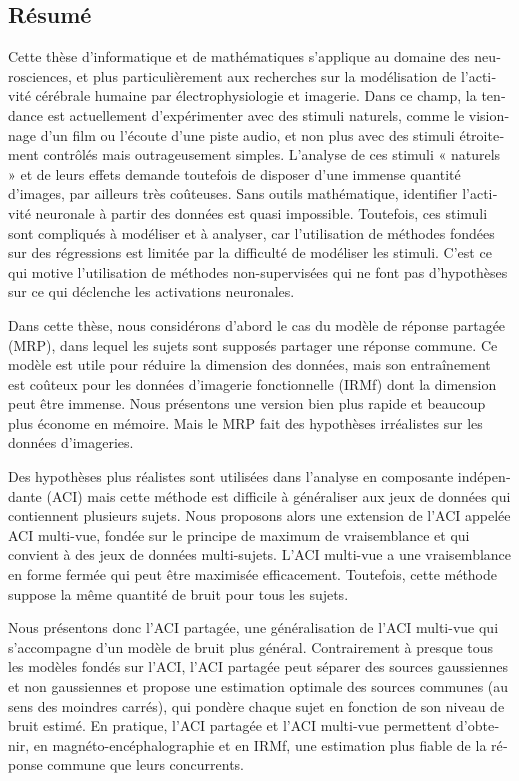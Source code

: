 \begin{otherlanguage}{french}
\chapter*{Résumé}
Cette thèse d'informatique et de mathématiques s'applique au domaine des neurosciences, et plus particulièrement aux recherches sur la modélisation de l'activité cérébrale humaine par électrophysiologie et imagerie.
%
Dans ce champ, la tendance est actuellement d’expérimenter avec des stimuli naturels, comme le visionnage d’un film ou l’écoute d’une piste audio, et non plus avec des stimuli étroitement contrôlés mais outrageusement simples.
%
L’analyse de ces stimuli « naturels » et de leurs effets demande toutefois de disposer d’une immense quantité d’images, par ailleurs très coûteuses. Sans outils mathématique, identifier l'activité neuronale à partir des données est quasi impossible.
%
Toutefois, ces stimuli sont compliqués à modéliser et à analyser, car l'utilisation de méthodes fondées sur des régressions est limitée par la difficulté de modéliser les stimuli.
%
C'est ce qui motive l'utilisation de méthodes non-supervisées qui ne font pas d'hypothèses sur ce qui déclenche les activations neuronales.

Dans cette thèse, nous considérons d'abord le cas du modèle de réponse partagée (MRP), dans lequel les sujets sont supposés partager une réponse commune. Ce modèle est utile pour réduire la dimension des données, mais son entraînement est coûteux pour les données d'imagerie fonctionnelle (IRMf) dont la dimension peut être immense.
%
Nous présentons une version bien plus rapide et beaucoup plus économe en mémoire. Mais le MRP fait des hypothèses irréalistes sur les données d'imageries.

Des hypothèses plus réalistes sont utilisées dans l'analyse en composante indépendante (ACI) mais cette méthode est difficile à généraliser aux jeux de données qui contiennent plusieurs sujets.
%
Nous proposons alors une extension de l'ACI appelée ACI multi-vue, fondée sur le principe de maximum de vraisemblance
et qui convient à des jeux de données multi-sujets.
%
L’ACI multi-vue a une vraisemblance en forme fermée qui peut être maximisée efficacement. Toutefois, cette méthode suppose la même quantité de bruit pour tous les sujets.

Nous présentons donc l’ACI partagée, une généralisation de l’ACI multi-vue qui s'accompagne d'un modèle de bruit plus général.
%
Contrairement à presque tous les modèles fondés sur l'ACI, l’ACI partagée peut séparer des sources gaussiennes et non gaussiennes et propose une estimation optimale des sources communes (au sens des moindres carrés), qui pondère chaque sujet en fonction de son niveau de bruit estimé.
%
En pratique, l’ACI partagée et l’ACI multi-vue permettent d'obtenir, en magnéto-encéphalographie et en IRMf, une estimation plus fiable de la réponse commune que leurs concurrents.


\end{otherlanguage}
